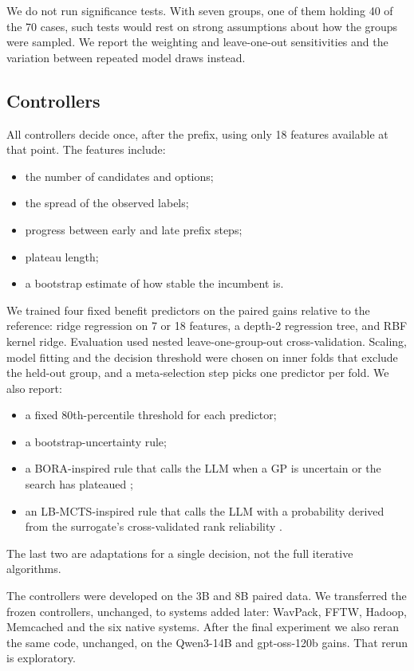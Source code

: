 We do not run significance tests. With seven groups, one of them holding 40 of the 70 cases, such tests would rest on strong assumptions about how the groups were sampled. We report the weighting and leave-one-out sensitivities and the variation between repeated model draws instead.

\subsection{Controllers}

All controllers decide once, after the prefix, using only 18 features available at that point. The features include:
\begin{itemize}
  \item the number of candidates and options;
  \item the spread of the observed labels;
  \item progress between early and late prefix steps;
  \item plateau length;
  \item a bootstrap estimate of how stable the incumbent is.
\end{itemize}

We trained four fixed benefit predictors on the paired gains relative to the reference: ridge regression on 7 or 18 features, a depth-2 regression tree, and RBF kernel ridge. Evaluation used nested leave-one-group-out cross-validation. Scaling, model fitting and the decision threshold were chosen on inner folds that exclude the held-out group, and a meta-selection step picks one predictor per fold. We also report:
\begin{itemize}
  \item a fixed 80th-percentile threshold for each predictor;
  \item a bootstrap-uncertainty rule;
  \item a BORA-inspired rule that calls the LLM when a GP is uncertain or the search has plateaued \cite{cisse2025bora};
  \item an LB-MCTS-inspired rule that calls the LLM with a probability derived from the surrogate's cross-validated rank reliability \cite{xu2026lbmcts}.
\end{itemize}
The last two are adaptations for a single decision, not the full iterative algorithms.

The controllers were developed on the 3B and 8B paired data. We transferred the frozen controllers, unchanged, to systems added later: WavPack, FFTW, Hadoop, Memcached and the six native systems. After the final experiment we also reran the same code, unchanged, on the Qwen3-14B and gpt-oss-120b gains. That rerun is exploratory.

